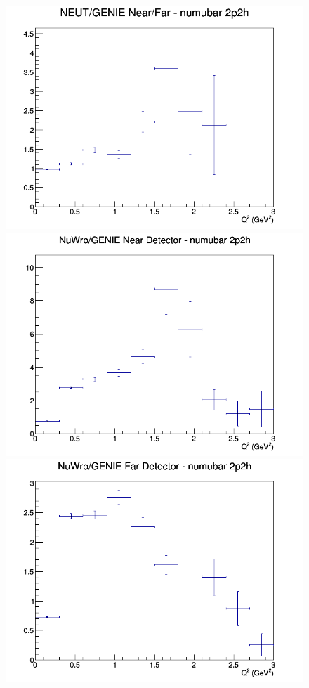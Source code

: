 \begin{figure}[h]
\endminipage
{}
\includegraphics[width=\linewidth]{eff_Q2/FGT/ratios/2p2h_NEUT_GENIE_numubar_NF_Q2.png}
\endminipage
\newline
{}
\includegraphics[width=\linewidth]{eff_Q2/FGT/ratios/2p2h_NuWro_GENIE_numubar_near_Q2.png}
\endminipage
{}
\includegraphics[width=\linewidth]{eff_Q2/FGT/ratios/2p2h_NuWro_GENIE_numubar_far_Q2.png}

\end{figure}
